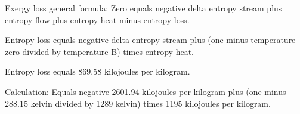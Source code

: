 Exergy loss general formula:  
Zero equals negative delta entropy stream plus entropy flow plus entropy heat minus entropy loss.  

Entropy loss equals negative delta entropy stream plus (one minus temperature zero divided by temperature B) times entropy heat.  

Entropy loss equals 869.58 kilojoules per kilogram.  

Calculation:  
Equals negative 2601.94 kilojoules per kilogram plus (one minus 288.15 kelvin divided by 1289 kelvin) times 1195 kilojoules per kilogram.